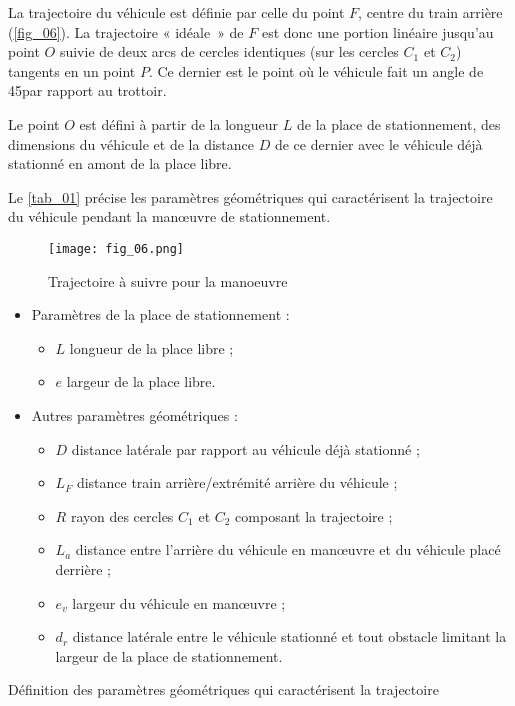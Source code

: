 La trajectoire du véhicule est définie par celle du point $F$, centre du train arrière (\autoref{fig_06}). La trajectoire
« idéale~» de $F$ est donc une portion linéaire jusqu’au point $O$ suivie de deux arcs de cercles identiques (sur les cercles $C_1$ et $C_2$) tangents en un point $P$. Ce dernier est le point où le véhicule fait un angle de 45\degres par rapport
au trottoir.

Le point $O$ est défini à partir de la longueur $L$  de la place de stationnement, des dimensions du véhicule et de
la distance $D$ de ce dernier avec le véhicule déjà stationné en amont de la place libre.

Le \autoref{tab_01} précise les paramètres géométriques qui caractérisent la trajectoire du véhicule pendant la manœuvre de stationnement.

\ifprof
\begin{corrige}
\end{corrige}
\else
\fi

\begin{figure}[H]
\centering
\texttt{[image: fig\_06.png]}
\caption{Trajectoire à suivre pour la manoeuvre \label{fig_06}}
\end{figure}

\begin{table}
\begin{itemize}
\item Paramètres de la place de stationnement :
\begin{itemize}
\item $L$ longueur de la place libre ;
\item $e$ largeur de la place libre.
\end{itemize}
\item Autres paramètres géométriques :
\begin{itemize}
\item $D$ distance latérale par rapport au véhicule déjà stationné ;
\item $L_F$ distance train arrière/extrémité arrière du véhicule ;
\item $R$ rayon des cercles $C_1$ et $C_2$ composant la trajectoire ;
\item $L_a$ distance entre l’arrière du véhicule en manœuvre et du véhicule placé derrière ;
\item $e_v$ largeur du véhicule en manœuvre ;
\item $d_r$ distance latérale entre le véhicule stationné et tout obstacle limitant la largeur de la place de stationnement.
\end{itemize}
\end{itemize}
\caption{Définition des paramètres géométriques qui caractérisent la trajectoire \label{tab_01}}
\end{table}

